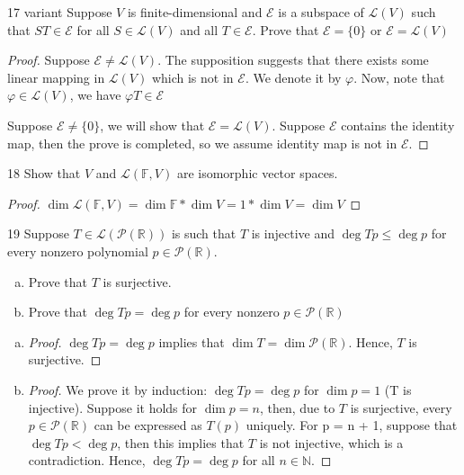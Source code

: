 \documentclass{article}
\newenvironment{problem}[1]{\begin{prob*}{#1}{}}{\end{prob*}}
\newcommand{\Hom}{\mathcal{L}}
\begin{document}
\begin{problem}{17 variant}
Suppose $V$ is finite-dimensional and $\mathcal{E}$ is a subspace of $\mathcal{L}(V)$ such that $ST \in \mathcal{E}$ for all $S \in \mathcal{L}(V)$ and all $T \in \mathcal{E}$. Prove that $\mathcal{E} = \{0\}$ or $\mathcal{E} = \mathcal{L}(V)$
\end{problem}
\begin{proof}
	Suppose $\mathcal{E} \neq \mathcal{L}(V)$. The supposition suggests that there exists some linear mapping in $\mathcal{L}(V)$ which is not in $\mathcal{E}$. We denote it by $\varphi$. Now, note that $\varphi \in \Hom(V)$, we have $\varphi T \in \mathcal{E}$
	\par
	Suppose $\mathcal{E} \neq \{0\}$, we will show that $\mathcal{E} = \mathcal{L}(V).$ Suppose $\mathcal{E}$ contains the identity map, then the prove is completed, so we assume identity map is not in $\mathcal{E}$.
\end{proof}

\begin{problem}{18}
Show that $V$ and $\mathcal{L}(\mathbb{F}, V)$ are isomorphic vector spaces.
\end{problem}
\begin{proof}
	$\operatorname{dim} \mathcal{L}(\mathbb{F}, V) = \operatorname{dim} \mathbb{F} * \operatorname{dim}V = 1 * \operatorname{dim} V = \operatorname{dim} V$
\end{proof}

\newpage

\begin{problem}{19}
Suppose $T \in \mathcal{L}(\mathcal{P}(\mathbb{R}))$ is such that $T$ is injective and $\operatorname{deg} Tp \le \operatorname{deg} p$ for every nonzero polynomial $p \in \mathcal{P}(\mathbb{R})$.
\begin{enumerate}[(a)]
	\item Prove that $T$ is surjective.
	\item Prove that $\operatorname{deg}Tp = \operatorname{deg}p$ for every nonzero $p \in \mathcal{P}(\mathbb{R})$
\end{enumerate}
\end{problem}
\begin{enumerate}[(a)]
	\item \begin{proof}
		      $\operatorname{deg}Tp = \operatorname{deg}p$ implies that $\operatorname{dim} T = \operatorname{dim} \mathcal{P}(\mathbb{R})$. Hence, $T$ is surjective.
	      \end{proof}
	\item \begin{proof}
		      We prove it by induction: $\operatorname{deg}Tp = \operatorname{deg}p$ for $\operatorname{dim}p = 1$ (T is injective). Suppose it holds for $\operatorname{dim} p = n$, then, due to $T$ is surjective, every  $p \in \mathcal{P}(\mathbb{R})$ can be expressed as $T(p)$ uniquely. For p = n + 1, suppose that $\operatorname{deg}Tp < \operatorname{deg}p$, then this implies that $T$ is not injective, which is a contradiction. Hence, $\operatorname{deg}Tp = \operatorname{deg}p$ for all $n \in \mathbb{N}$.
	      \end{proof}
\end{enumerate}
\end{document}
